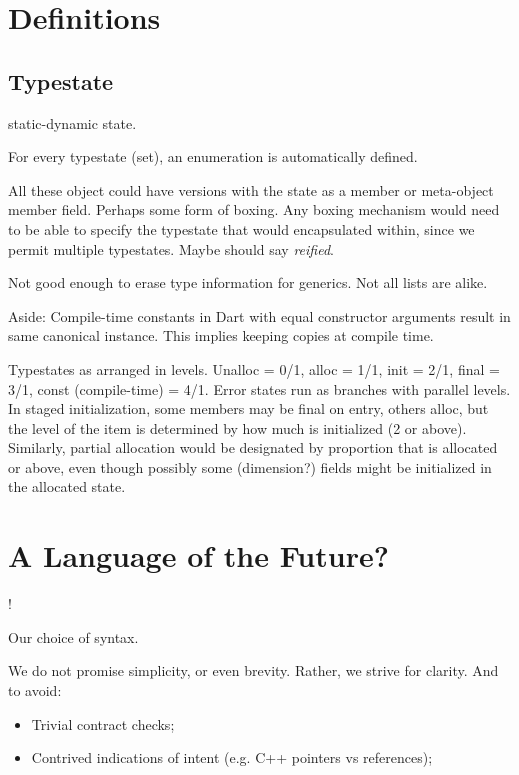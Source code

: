 \documentclass[10pt]{amsart}
\begin{document}
\section{Definitions}


\subsection{Typestate}

static-dynamic state.

For every typestate (set), an enumeration is automatically defined.

All these object could have versions with the state as a member or
meta-object member field.  Perhaps some form of boxing.  Any boxing
mechanism would need to be able to specify the typestate that would
encapsulated within, since we permit multiple typestates.  Maybe
should say \emph{reified}.

Not good enough to erase type information for generics.  Not all lists
are alike.

Aside: Compile-time constants in Dart with equal constructor arguments
result in same canonical instance.  This implies keeping copies at
compile time.

Typestates as arranged in levels.  Unalloc = 0/1, alloc = 1/1, init =
2/1, final = 3/1, const (compile-time) = 4/1.  Error states run as
branches with parallel levels.  In staged initialization, some members
may be final on entry, others alloc, but the level of the item is
determined by how much is initialized (2 or above).  Similarly,
partial allocation would be designated by proportion that is allocated
or above, even though possibly some (dimension?) fields might be
initialized in the allocated state.


\section{A Language of the Future?}

\Utop!

Our choice of syntax.


We do not promise simplicity, or even brevity.  Rather, we strive for
clarity.  And to avoid:
\begin{itemize}
\item Trivial contract checks;
\item Contrived indications of intent (e.g. C++ pointers vs references);
\end{itemize}
\end{document}
